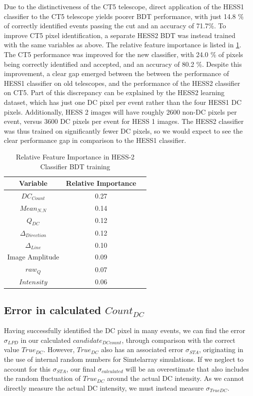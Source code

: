 \documentclass{article}
\begin{document}
Due to the distinctiveness of the CT5 telescope, direct application of the HESS1 classifier to the CT5 telescope yields poorer BDT performance, with just 14.8 \% of correctly identified events passing the cut and an accuracy of 71.7\%. To improve CT5 pixel identification, a separate HESS2 BDT was instead trained with the same variables as above. The relative feature importance is listed in \ref{tab:hess2classifier}. The CT5 performance was improved for the new classifier, with 24.0 \% of pixels being correctly identified and accepted, and an accuracy of 80.2 \%. Despite this improvement, a clear gap emerged between the between the performance of HESS1 classifier on old telescopes, and the performance of the HESS2 classifier on CT5. Part of this discrepancy can be explained by the HESS2 learning dataset, which has just one DC pixel per event rather than the four HESS1 DC pixels. Additionally, HESS 2 images will have roughly 2600 non-DC pixels per event, versus 3600 DC pixels per event for HESS 1 images. The HESS2 classifier was thus trained on significantly fewer DC pixels, so we would expect to see the clear performance gap in comparison to the HESS1 classifier.

\begin{table}[h!]
  \centering
  \caption{Relative Feature Importance in HESS-2 Classifier BDT training}
  \label{tab:hess2classifier}
  \begin{tabular}{ccc}
    \toprule
    Variable & Relative Importance\\
    \midrule
    $DC_{Count}$ & 0.27\\
    $Mean_{N.N}$ & 0.14\\
    $Q_{DC}$ & 0.12\\
    $\Delta_{Direction}$ & 0.12\\
    $\Delta_{Line}$ & 0.10\\
    Image Amplitude & 0.09\\
    $raw_{Q}$ & 0.07\\
    $Intensity$ & 0.06\\
    \bottomrule
  \end{tabular}
\end{table}  

\subsection{Error in calculated $Count_{DC}$}
Having successfully identified the DC pixel in many events, we can find the error $\sigma_{LPD}$ in our calculated $candidate_{DC count}$, through comparison with the correct value $True_{DC}$. However, $True_{DC}$ also has an associated error $\sigma_{STA}$, originating in the use of internal random numbers for Sim\textunderscore telarray simulations. If we neglect to account for this $\sigma_{STA}$, our final $\sigma_{calculated}$ will be an overestimate that also includes the random fluctuation of $True_{DC}$ around the actual DC intensity. As we cannot directly measure the actual DC intensity, we must instead measure $\sigma_{TrueDC}$. 
\end{document}
